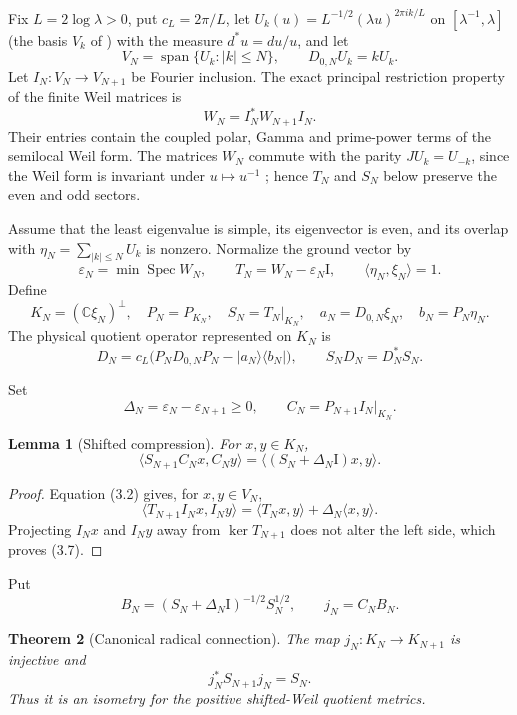 \documentclass[11pt]{amsart}
\newtheorem{theorem}{Theorem}[section]
\newtheorem{lemma}[theorem]{Lemma}
\theoremstyle{definition}
\theoremstyle{remark}
\newcommand{\C}{\mathbb C}
\newcommand{\Spec}{\operatorname{Spec}}
\newcommand{\id}{\mathrm I}
\newcommand{\eps}{\varepsilon}
\begin{document}
Fix \(L=2\log\lambda>0\), put \(c_L=2\pi/L\), let
\(U_k(u)=L^{-1/2}(\lambda u)^{2\pi ik/L}\) on \([\lambda^{-1},\lambda]\) (the basis \(V_k\) of \cite[(3.21)]{CCM}) with the
measure \(d^*u=du/u\), and let
\[
 V_N=\operatorname{span}\{U_k:|k|\le N\},
 \qquad D_{0,N}U_k=kU_k.
\tag{3.1}
\]
Let \(I_N:V_N\to V_{N+1}\) be Fourier inclusion.  The exact principal
restriction property of the finite Weil matrices is
\[
 W_N=I_N^*W_{N+1}I_N.
\tag{3.2}
\]
Their entries contain the coupled polar, Gamma and prime-power terms of the
semilocal Weil form.  The matrices \(W_N\) commute with the parity
\(JU_k=U_{-k}\), since the Weil form is invariant under \(u\mapsto u^{-1}\)
\cite[Lemma~5.2]{CCM}; hence \(T_N\) and \(S_N\) below preserve the even and
odd sectors.

Assume that the least eigenvalue is simple, its eigenvector is even, and its
overlap with
\(\eta_N=\sum_{|k|\le N}U_k\) is nonzero.  Normalize the ground vector by
\[
 \eps_N=\min\Spec W_N,
 \qquad T_N=W_N-\eps_N\id,
 \qquad \langle\eta_N,\xi_N\rangle=1.
\tag{3.3}
\]
Define
\[
 K_N=(\C\xi_N)^\perp,\quad P_N=P_{K_N},\quad
 S_N=T_N|_{K_N},\quad
 a_N=D_{0,N}\xi_N,\quad b_N=P_N\eta_N.
\tag{3.4}
\]
The physical quotient operator represented on \(K_N\) is
\[
 D_N=c_L\bigl(P_ND_{0,N}P_N-|a_N\rangle\langle b_N|\bigr),
 \qquad S_ND_N=D_N^*S_N.
\tag{3.5}
\]

Set
\[
 \Delta_N=\eps_N-\eps_{N+1}\ge0,
 \qquad C_N=P_{N+1}I_N|_{K_N}.
\tag{3.6}
\]

\begin{lemma}[Shifted compression]
For \(x,y\in K_N\),
\[
 \langle S_{N+1}C_Nx,C_Ny\rangle
 =\langle(S_N+\Delta_N\id)x,y\rangle.
\tag{3.7}
\]
\end{lemma}

\begin{proof}
Equation (3.2) gives, for \(x,y\in V_N\),
\[
 \langle T_{N+1}I_Nx,I_Ny\rangle
 =\langle T_Nx,y\rangle+\Delta_N\langle x,y\rangle.
\]
Projecting \(I_Nx\) and \(I_Ny\) away from \(\ker T_{N+1}\) does not alter
the left side, which proves (3.7).
\end{proof}

Put
\[
 B_N=(S_N+\Delta_N\id)^{-1/2}S_N^{1/2},
 \qquad j_N=C_NB_N.
\tag{3.8}
\]

\begin{theorem}[Canonical radical connection]
The map \(j_N:K_N\to K_{N+1}\) is injective and
\[
 j_N^*S_{N+1}j_N=S_N.
\tag{3.9}
\]
Thus it is an isometry for the positive shifted-Weil quotient metrics.
\end{theorem}
\end{document}
